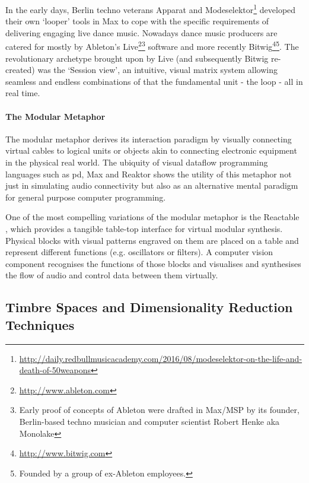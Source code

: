 In the early days, Berlin techno veterans Apparat and Modeselektor\footnote{\url{http://daily.redbullmusicacademy.com/2016/08/modeselektor-on-the-life-and-death-of-50weapons}} developed their own `looper' tools in Max to cope with the specific requirements of delivering engaging live dance music. Nowadays dance music producers are catered for mostly by Ableton's Live\footnote{\url{http://www.ableton.com}}\footnote{Early proof of concepts of Ableton were drafted in Max/MSP by its founder, Berlin-based techno musician and computer scientist Robert Henke aka Monolake} software and more recently Bitwig\footnote{\url{http://www.bitwig.com}}\footnote{Founded by a group of ex-Ableton employees.}. The revolutionary archetype brought upon by Live (and subsequently Bitwig re-created) was the `Session view', an intuitive, visual matrix system allowing seamless and endless combinations of that the fundamental unit - the loop - all in real time.

\paragraph{The Modular Metaphor}

The modular metaphor derives its interaction paradigm by visually connecting virtual cables to logical units or objects akin to connecting electronic equipment in the physical real world. The ubiquity of visual dataflow programming languages such as \acrshort{pd}, Max and Reaktor shows the utility of this metaphor not just in simulating audio connectivity but also as an alternative mental paradigm for general purpose computer programming.

One of the most compelling variations of the modular metaphor is the Reactable \citep{Jorda2005}, which provides a tangible table-top interface for virtual modular synthesis. Physical blocks with visual patterns engraved on them are placed on a table and represent different functions (e.g. oscillators or filters). A computer vision component recognises the functions of those blocks and visualises and synthesises the flow of audio and control data between them virtually. 

\subsection{Timbre Spaces and Dimensionality Reduction Techniques}

